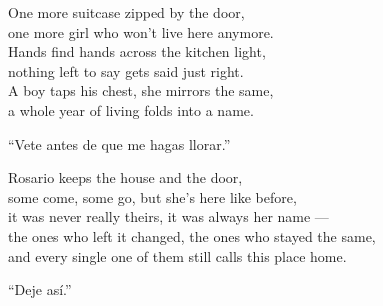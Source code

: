 \begin{lyrics}
One more suitcase zipped by the door,\\
one more girl who won't live here anymore.\\
Hands find hands across the kitchen light,\\
nothing left to say gets said just right.\\
A boy taps his chest, she mirrors the same,\\
a whole year of living folds into a name.

``Vete antes de que me hagas llorar.''

Rosario keeps the house and the door,\\
some come, some go, but she's here like before,\\
it was never really theirs, it was always her name —\\
the ones who left it changed, the ones who stayed the same,\\
and every single one of them still calls this place home.

``Deje así.''
\end{lyrics}

